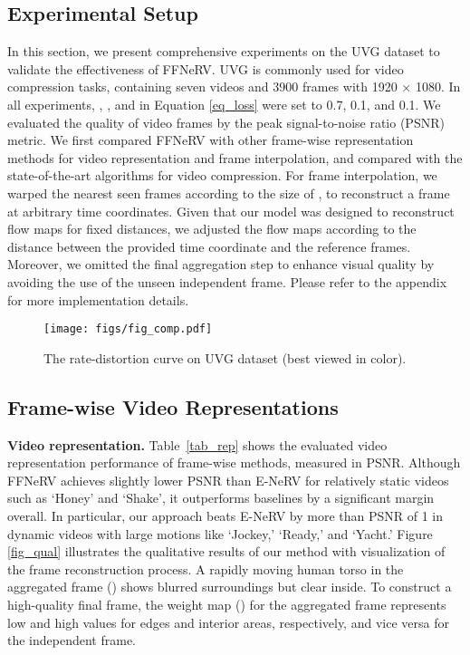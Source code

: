 \documentclass[sigconf]{acmart}
\begin{document}
\subsection{Experimental Setup}
In this section, we present comprehensive experiments on the UVG dataset \cite{uvg} to validate the effectiveness of FFNeRV.
UVG is commonly used for video compression tasks, containing seven videos and 3900 frames with 1920 × 1080.
In all experiments, , , and  in Equation \ref{eq_loss} were set to 0.7, 0.1, and 0.1.
We evaluated the quality of video frames by the peak signal-to-noise ratio (PSNR) metric.
We first compared FFNeRV with other frame-wise representation methods for video representation and frame interpolation, and compared with the state-of-the-art algorithms for video compression.
For frame interpolation, we warped the nearest seen frames according to the size of , to reconstruct a frame at arbitrary time coordinates. 
Given that our model was designed to reconstruct flow maps for fixed distances, we adjusted the flow maps according to the distance between the provided time coordinate and the reference frames. Moreover, we omitted the final aggregation step to enhance visual quality by avoiding the use of the unseen independent frame.
Please refer to the appendix for more implementation details.





\begin{figure}[t]
\begin{center}
\texttt{[image: figs/fig\_comp.pdf]}
\end{center}
   \caption{The rate-distortion curve on UVG dataset (best viewed in color).}
\label{fig_comp}
\end{figure}

\subsection{Frame-wise Video Representations}


\noindent\textbf{Video representation.} 
Table~\ref{tab_rep} shows the evaluated video representation performance of frame-wise methods, measured in PSNR.
Although FFNeRV achieves slightly lower PSNR than E-NeRV for relatively static videos such as `Honey' and `Shake', it outperforms baselines by a significant margin overall.
In particular, our approach beats E-NeRV by more than PSNR of 1 in dynamic videos with large motions like `Jockey,' `Ready,' and `Yacht.'
Figure \ref{fig_qual} illustrates the qualitative results of our method with visualization of the frame reconstruction process.
A rapidly moving human torso in the aggregated frame () shows blurred surroundings but clear inside.
To construct a high-quality final frame, the weight map () for the aggregated frame represents low and high values for edges and interior areas, respectively, and vice versa for the independent frame.
\end{document}
